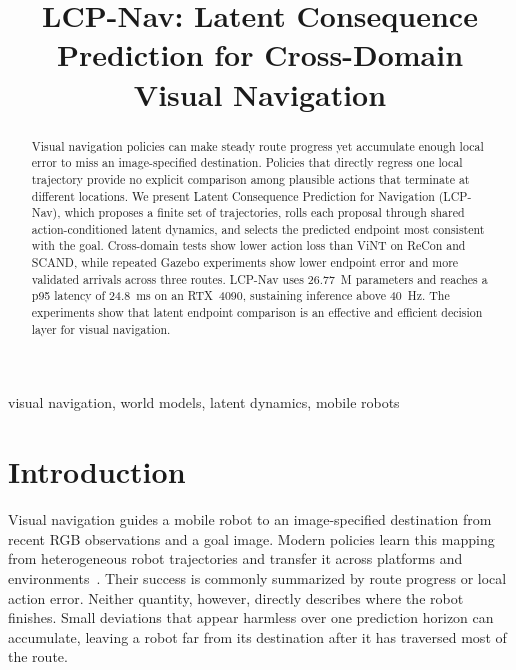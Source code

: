 \documentclass[conference]{IEEEtran}
\begin{document}
\title{LCP-Nav: Latent Consequence Prediction for Cross-Domain Visual Navigation}

\author{
}

\maketitle

\begin{abstract}
Visual navigation policies can make steady route progress yet accumulate enough local error to miss an image-specified destination. Policies that directly regress one local trajectory provide no explicit comparison among plausible actions that terminate at different locations. We present Latent Consequence Prediction for Navigation (LCP-Nav), which proposes a finite set of trajectories, rolls each proposal through shared action-conditioned latent dynamics, and selects the predicted endpoint most consistent with the goal. Cross-domain tests show lower action loss than ViNT on ReCon and SCAND, while repeated Gazebo experiments show lower endpoint error and more validated arrivals across three routes. LCP-Nav uses 26.77~M parameters and reaches a p95 latency of 24.8~ms on an RTX~4090, sustaining inference above 40~Hz. The experiments show that latent endpoint comparison is an effective and efficient decision layer for visual navigation.
\end{abstract}

\begin{IEEEkeywords}
visual navigation, world models, latent dynamics, mobile robots
\end{IEEEkeywords}

\section{Introduction}

Visual navigation guides a mobile robot to an image-specified destination from recent RGB observations and a goal image. Modern policies learn this mapping from heterogeneous robot trajectories and transfer it across platforms and environments~\cite{gnm,vint}. Their success is commonly summarized by route progress or local action error. Neither quantity, however, directly describes where the robot finishes. Small deviations that appear harmless over one prediction horizon can accumulate, leaving a robot far from its destination after it has traversed most of the route.
\end{document}
